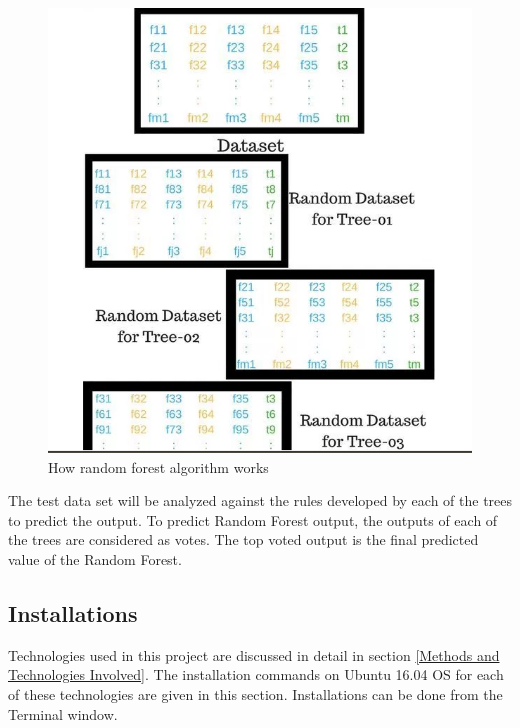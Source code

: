 \documentclass[sigconf]{acmart}
\begin{document}
\begin{figure}[htb]
  \centering
  \includegraphics[width=1.0\columnwidth]{images/Figure4.png}
  \caption{How random forest algorithm works
  \cite{random-forest}}
  \label{fig:Figure4} 
\end{figure}

The test data set will be analyzed against the rules developed by each of the trees to predict the output. To predict Random Forest output, the outputs of each of the trees are considered as votes. The top voted output is the final predicted value of the Random Forest.


\subsection{Installations}

Technologies used in this project are discussed in detail in section \ref{Methods and Technologies Involved}. The installation commands on Ubuntu 16.04 OS for each of these technologies are given in this section. Installations can be done from the Terminal window. 
\end{document}
